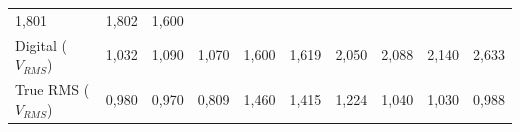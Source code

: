 \documentclass[14pt, oneside]{book}
\theoremstyle{definition}
\begin{document}
\begin{table}[H]
{\begin{tabular}{ l l l l l l l l l l }
                            \multicolumn{1}{p{0.783cm}|}{1,801 \centering } &
                            \multicolumn{1}{p{0.933cm}|}{1,802 \centering } &
                            \multicolumn{1}{p{0.933cm}|}{1,600 \centering }
                      \\  
                        \cline{1-1}\cline{2-2}\cline{3-3}\cline{4-4}\cline{5-5}\cline{6-6}\cline{7-7}\cline{8-8}\cline{9-9}\cline{10-10}  
                            \multicolumn{1}{|p{3.033cm}|}{Digital ($V_{RMS}$) \centering } &
                            \multicolumn{1}{p{1.367cm}|}{1,032 \centering } &
                            \multicolumn{1}{p{1.333cm}|}{1,090 \centering } &
                            \multicolumn{1}{p{1.000cm}|}{1,070 \centering } &
                            \multicolumn{1}{p{1.350cm}|}{1,600 \centering } &
                            \multicolumn{1}{p{1.050cm}|}{1,619 \centering } &
                            \multicolumn{1}{p{0.983cm}|}{2,050 \centering } &
                            \multicolumn{1}{p{0.783cm}|}{2,088 \centering } &
                            \multicolumn{1}{p{0.933cm}|}{2,140 \centering } &
                            \multicolumn{1}{p{0.933cm}|}{2,633 \centering }
                      \\  
                        \cline{1-1}\cline{2-2}\cline{3-3}\cline{4-4}\cline{5-5}\cline{6-6}\cline{7-7}\cline{8-8}\cline{9-9}\cline{10-10}  
                            \multicolumn{1}{|p{3.033cm}|}{True RMS ($V_{RMS}$) \centering } &
                            \multicolumn{1}{p{1.367cm}|}{0,980 \centering } &
                            \multicolumn{1}{p{1.333cm}|}{0,970 \centering } &
                            \multicolumn{1}{p{1.000cm}|}{0,809 \centering } &
                            \multicolumn{1}{p{1.350cm}|}{1,460 \centering } &
                            \multicolumn{1}{p{1.050cm}|}{1,415 \centering } &
                            \multicolumn{1}{p{0.983cm}|}{1,224 \centering } &
                            \multicolumn{1}{p{0.783cm}|}{1,040 \centering } &
                            \multicolumn{1}{p{0.933cm}|}{1,030 \centering } &
                            \multicolumn{1}{p{0.933cm}|}{0,988 \centering }
                      \\  
                        \hline
                    
                    \end{tabular} }
                \end{table}
                
\end{document}
